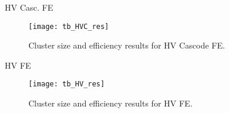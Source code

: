 \begin{description}
\item[HV Casc. FE]
\end{description}

\begin{figure}[h!]
\centering
\texttt{[image: tb\_HVC\_res]}
\caption{Cluster size and efficiency results for HV Cascode FE.}
\label{fig:tb_HVC}
\end{figure}


\begin{description}
\item[HV FE]
\end{description}

\begin{figure}[h!]
\centering
\texttt{[image: tb\_HV\_res]}
\caption{Cluster size and efficiency results for HV FE.}
\label{fig:tb_HV}
\end{figure}
































